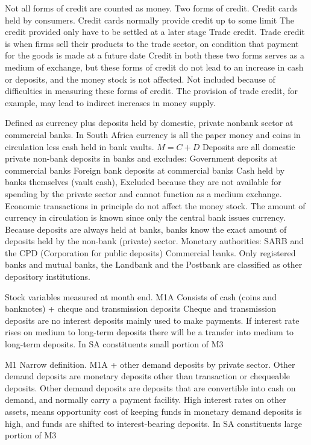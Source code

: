 \documentclass[12pt]{examnotes}
\begin{document}
\ra Not all forms of credit are counted as money. 
\ra Two forms of credit.
 Credit cards held by consumers. 
\rna Credit cards normally provide credit up to some limit
\rna  The credit provided only have to be settled at a later stage
 Trade credit.
\rna  Trade credit is when firms sell their products to the trade sector, on condition that payment for the goods is made at a future date
\ra Credit in both these two forms serves as a medium of exchange, but these forms of credit do not lead to an increase in cash or deposits, and the money stock is not affected.
\ra Not included because of difficulties in measuring these forms of credit. 
\ra The provision of trade credit, for example, may lead to indirect increases in money supply.

\ra Defined as currency plus deposits held by domestic, private nonbank sector at commercial banks.
\ra In South Africa currency is all the paper money and coins in circulation less cash held in bank vaults. \ra $M=C+D$
\ra Deposits are all domestic private non-bank deposits in banks and excludes:
 Government deposits at commercial banks  
 Foreign bank deposits at commercial banks
 Cash held by banks themselves (vault cash), Excluded because they are not available for spending by the private sector and cannot function as a medium exchange.
\ra Economic transactions in principle do not affect the money stock.
\ra The amount of currency in circulation is known since only the central bank issues currency. 
\ra Because deposits are always held at banks, banks know the exact amount of deposits held by the non-bank (private) sector.
\ra Monetary authorities: SARB and the CPD (Corporation for public deposits) 
\ra Commercial banks. Only registered banks and mutual banks, the Landbank and the Postbank are classified as other depository institutions.

\ra Stock variables measured at month end.
 M1A 
\rna Consists of cash (coins and banknotes) + cheque and transmission deposits 
\rna Cheque and transmission deposits are no interest deposits mainly used to make payments. 
\rna If interest rate rises on medium to long-term deposits there will be a transfer into medium to long-term deposits.
\rna In SA constituents small portion of M3

 M1 Narrow definition.
\rna M1A + other demand deposits by private sector.
\rna Other demand deposits are monetary deposits other than transaction or chequeable deposits.
\rna Other demand deposits are deposits that are convertible into cash on demand, and normally carry a payment facility.
\rna High interest rates on other assets, means opportunity cost of keeping funds in monetary demand deposits is high, and funds are shifted to interest-bearing deposits.
\rna In SA constituents large portion of M3
\end{document}
